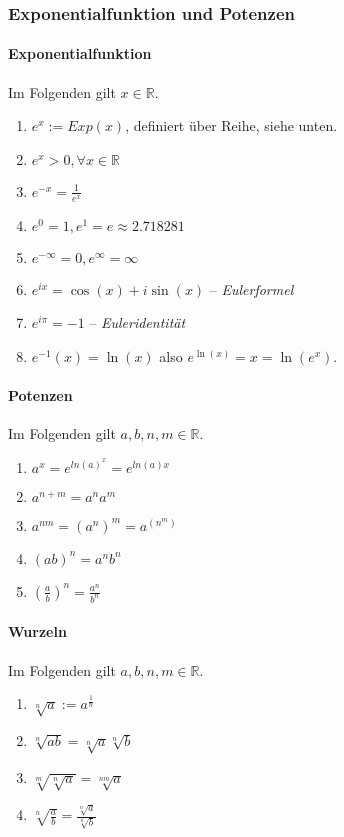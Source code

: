 \documentclass[a4paper, 9pt, DIV=24]{scrartcl}
\begin{document}
\subsubsection{Exponentialfunktion und Potenzen}
\paragraph{Exponentialfunktion} Im Folgenden gilt $x \in\mathbb{R}$.
\begin{enumerate}[label={(}\arabic*{)}]
 \item $e^x := Exp(x)$, definiert über Reihe, siehe unten.
 \item $e^x > 0, \forall x\in\mathbb{R}$
 \item $e^{-x} = \frac{1}{e^x}$
 \item $e^0 = 1, e^1 = e \approx 2.718281$
 \item $e^{-\infty} = 0, e^{\infty} = \infty$
 \item $e^{ix} = \cos(x) + i\sin(x)$ – \emph{Eulerformel}
 \item $e^{i\pi} = -1$ – \emph{Euleridentität}
 \item $e^{-1}(x) = \ln(x)$ also $e^{\ln(x)} = x = \ln(e^x)$.
\end{enumerate}
\paragraph{Potenzen} Im Folgenden gilt $a,b,n,m \in\mathbb{R}$.
\begin{enumerate}[label={(}\arabic*{)}]
 \item $a^x = e^{ln(a)^{x}} = e^{ln(a)x}$
 \item $a^{n+m} = a^na^m$
 \item $a^{nm} = (a^n)^m = a^{(n^m)}$
 \item $(ab)^n = a^nb^n$
 \item $(\frac{a}{b})^n = \frac{a^n}{b^n}$
\end{enumerate}
\paragraph{Wurzeln} Im Folgenden gilt $a,b,n,m \in\mathbb{R}$.
\begin{enumerate}[label={(}\arabic*{)}]
 \item $\sqrt[n]{a} := a^{\frac{1}{n}}$
 \item $\sqrt[n]{ab} = \sqrt[n]{a}\sqrt[n]{b}$
 \item $\sqrt[m]{\sqrt[n]{a}} = \sqrt[nm]{a}$
 \item $\sqrt[n]{\frac{a}{b}} = \frac{\sqrt[n]{a}}{\sqrt[n]{b}}$
\end{enumerate}
\end{document}
